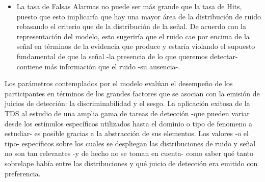 \begin{enumerate}
  \begin{itemize}
  \item La tasa de Falsas Alarmas no puede ser más grande que la tasa de Hits, puesto que esto implicaría que hay una mayor área de la distribución de ruido rebasando el criterio que de la distribución de la señal. De acuerdo con la representación del modelo, esto sugeriría que el ruido cae por encima de la señal en términos de la evidencia que produce y estaría violando el supuesto fundamental de que la señal -la presencia de lo que queremos detectar- contiene más información que el ruido -su ausencia-.\\
  \end{itemize}
\end{enumerate}

Los parámetros contemplados por el modelo evalúan el desempeño de los participantes en términos de los grandes factores que se asocian con la emisión de juicios de detección: la discriminabilidad y el sesgo. La aplicación exitosa de la TDS al estudio de una amplia gama de tareas de detección -que pueden variar desde los estímulos específicos utilizados hasta el dominio o tipo de fenomeno a estudiar- es posible gracias a la abstracción de sus elementos. Los valores -o el tipo- específicos sobre los cuales se despliegan las distribuciones de ruido y señal no son tan relevantes -y de hecho no se toman en cuenta- como saber qué tanto sobrelape había entre las distribuciones y qué juicio de detección era emitido con preferencia.\\


